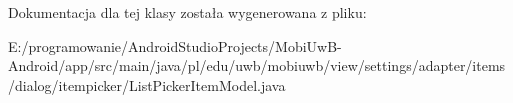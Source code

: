 Dokumentacja dla tej klasy została wygenerowana z pliku\+:\begin{DoxyCompactItemize}
\item 
E\+:/programowanie/\+Android\+Studio\+Projects/\+Mobi\+Uw\+B-\/\+Android/app/src/main/java/pl/edu/uwb/mobiuwb/view/settings/adapter/items/dialog/itempicker/List\+Picker\+Item\+Model.\+java\end{DoxyCompactItemize}
